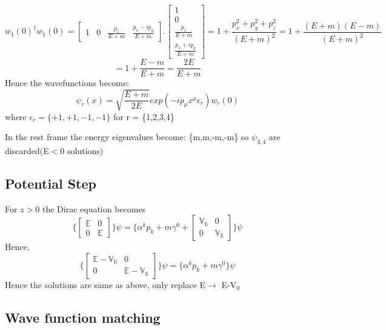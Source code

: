 \documentclass[11pt]{article}
\begin{document}
	 \[
	 	w_1(0)^\dagger w_1(0) = \begin{bmatrix}1&0&\frac{p_z}{E+m}&\frac{p_x-ip_y}{E+m}\end{bmatrix}.\begin{bmatrix}1\\0\\\frac{p_z}{E+m}\\\frac{p_x+ip_y}{E+m}\end{bmatrix} = 1 + \frac{p_x^2 + p_y^2 + p_z^2}{(E+m)^2}  = 1 + \frac{(E+m)(E-m)}{(E+m)^2}
	 \]
	 \[
	 	= 1+\frac{E-m}{E+m} = \frac{2E}{E+m}
	 \]
	 Hence the wavefunctions become:
	 \[
	 	\psi_r(x) = \sqrt{\frac{E+m}{2E}}exp(-ip_\mu x^\mu\epsilon_r)w_r(0)
	 \]
	 where \(\epsilon_r = \{+1,+1,-1,-1\}\) for r = \{1,2,3,4\}
	 
	 In the rest frame the energy eigenvalues become:
	 \{m,m,-m,-m\} so \(\psi_{3,4}\) are discarded(E$<0$ solutions)
	 
	\subsection{Potential Step}
	
	 For $z>0$ the Dirac equation becomes
	 \[
	 	\{\begin{bmatrix}\mathbb{E}&0\\0&\mathbb{E}\end{bmatrix}\}\psi =\{ \alpha^k p_k + m \gamma^0 +  \begin{bmatrix}\mathbb{V_0}&0\\0&\mathbb{V_0}\end{bmatrix}\}\psi
	 \]
	 Hence,
	 \[
	 	\{\begin{bmatrix}\mathbb{E-V_0}&0\\0&\mathbb{E-V_0}\end{bmatrix}\}\psi =\{ \alpha^k p_k + m \gamma^0\}\psi
	 \]
	 Hence the solutions are same as above, only replace E$\rightarrow$ E-V$_0$
	 
	 \subsection{Wave function matching}
	 
\end{document}
